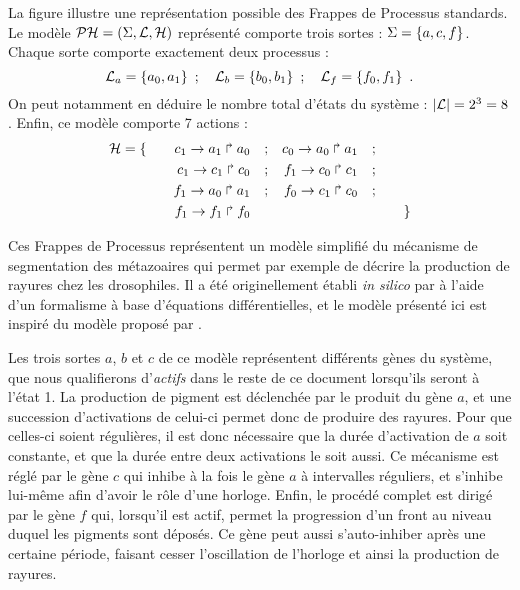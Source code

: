 \begin{example}
  La figure  illustre une représentation possible des
  Frappes de Processus standards.
  Le modèle $\mathcal{PH} = (\Sigma, \mathcal{L}, \mathcal{H})$ représenté comporte trois sortes :
  $\Sigma = \{ a, c, f \}$.
  Chaque sorte comporte exactement deux processus :
  \[\mathcal{L}_a = \{ a_0, a_1 \} \enspace;\quad
    \mathcal{L}_b = \{ b_0, b_1 \} \enspace;\quad
    \mathcal{L}_f = \{ f_0, f_1 \} \enspace.\]
  On peut notamment en déduire le nombre total d'états du système :
  $|\mathcal{L}| = 2^3 = 8$.
  Enfin, ce modèle comporte 7 actions :
  \begin{align*}
    \mathcal{H} = \{\qquad
      c_1\rightarrow a_1\Rsh a_0\quad; && c_0\rightarrow a_0\Rsh a_1\quad;& \\
      c_1\rightarrow c_1\Rsh c_0\quad; && f_1\rightarrow c_0\Rsh c_1\quad;& \\
      f_1\rightarrow a_0\Rsh a_1\quad; && f_0\rightarrow c_1\Rsh c_0\quad;& \\
      f_1\rightarrow f_1\Rsh f_0\quad\; &&& 
    \qquad\}
  \end{align*}
  
  Ces Frappes de Processus représentent un modèle simplifié du mécanisme
  de segmentation des métazoaires qui permet par exemple de décrire la production de rayures
  chez les drosophiles.
  Il a été originellement établi \textit{in silico} par 
  à l'aide d'un formalisme à base d'équations différentielles,
  et le modèle présenté ici est inspiré du modèle proposé par .
  
  Les trois sortes $a$, $b$ et $c$ de ce modèle représentent différents gènes du système,
  que nous qualifierons d'\emph{actifs} dans le reste de ce document lorsqu'ils seront à l'état 1.
  La production de pigment est déclenchée par le produit du gène $a$,
  et une succession d'activations de celui-ci permet donc de produire des rayures.
  Pour que celles-ci soient régulières, il est donc nécessaire que la durée d'activation
  de $a$ soit constante, et que la durée entre deux activations le soit aussi.
  Ce mécanisme est réglé par le gène $c$ qui inhibe à la fois le gène $a$ à intervalles réguliers,
  et s'inhibe lui-même afin d'avoir le rôle d'une horloge.
  Enfin, le procédé complet est dirigé par le gène $f$ qui, lorsqu'il est actif,
  permet la progression d'un front au niveau duquel les pigments sont déposés.
  Ce gène peut aussi s'auto-inhiber après une certaine période, faisant cesser
  l'oscillation de l'horloge et ainsi la production de rayures.
  

\end{example}
